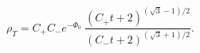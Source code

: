 \begin{equation}\label{rhot}
\rho_T = C_+C_-e^{-\Phi_0}\ 
   \frac{(C_+t+2)^{(\sqrt3-1)/2}}{(C_-t+2)^{(\sqrt3+1)/2}}.
\end{equation}

